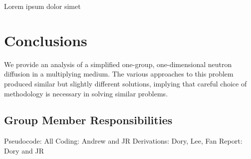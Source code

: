 \documentclass[../main.tex]{subfiles}
\begin{document}
Lorem ipsum dolor simet

\section{Conclusions}
	We provide an analysis of a simplified one-group, one-dimensional neutron diffusion in a multiplying medium. The various approaches to this problem produced similar but slightly different solutions, implying that careful choice of methodology is necessary in solving similar problems. 

\subsection{Group Member Responsibilities}
Pseudocode: All
Coding: Andrew and JR
Derivations: Dory, Lee, Fan
Report: Dory and JR
\end{document}
